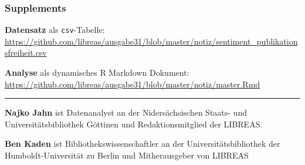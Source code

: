 \documentclass[a4paper,
fontsize=11pt,
oneside,
numbers=noperiodatend,
parskip=half-,
bibliography=totoc,
final
]{scrartcl}
\begin{document}
\subsubsection{Supplements}\label{supplements}

\textbf{Datensatz} als \texttt{csv}-Tabelle:
\url{https://github.com/libreas/ausgabe31/blob/master/notiz/sentiment_publikationsfreiheit.csv}

\textbf{Analyse} als dynamisches R Markdown Dokument:
\url{https://github.com/libreas/ausgabe31/blob/master/notiz/master.Rmd}

\begin{center}\rule{0.5\linewidth}{\linethickness}\end{center}

\textbf{Najko Jahn} ist Datenanalyst an der Nidersächsischen Staats- und
Universitätsbibliothek Göttinen und Redaktionsmitglied der LIBREAS.

\textbf{Ben Kaden} ist Bibliothekswissenschaftler an der
Universitätsbibliothek der Humboldt-Universität zu Berlin und
Mitherausgeber von LIBREAS
\end{document}
